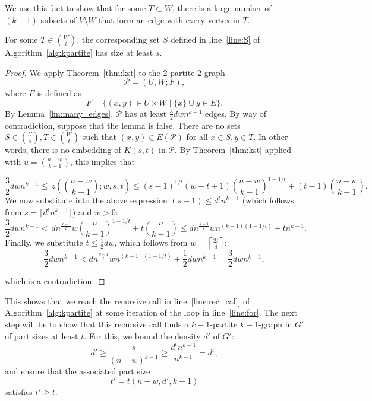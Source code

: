 We use this fact to show that for some $T \subset W$,
there is a large number of $(k-1)$-subsets of $V \setminus W$
that form an edge with every vertex in $T$.

\begin{lemma}\label{lm:return}
    For some $T \in \binom{W}{t}$, the corresponding set $S$ defined
    in line~\ref{line:S} of Algorithm~\ref{alg:kpartite} has size at least $s$.
    \begin{proof}
        We apply Theorem~\ref{thm:kst} to the $2$-partite $2$-graph
        \[
            \mathcal{P} = (U, W; F),
        \]
        where $F$ is defined as
        \[
            F = \{(x, y) \in U \times W \mid \{x\} \cup y \in E \}.
        \]
        By Lemma~\ref{lm:many_edges}, $\mathcal{P}$ has at least
        $\frac{3}{2}dwn^{k-1}$ edges.
        By way of contradiction, suppose that the lemma is false.
        There are no sets $S \in \binom{U}{s}, T \in \binom{W}{t}$
        such that $(x, y) \in E (\mathcal{P})$ for all $x \in S, y \in T $.
        In other words, there is no embedding of $K(s, t)$ in $\mathcal{P}$.
        By Theorem~\ref{thm:kst} applied with $u = \binom{n-w}{k-1}$,
        this implies that

        \[
            \frac{3}{2}dwn^{k-1} \leq
            \, z \left(\binom{n - w}{k-1}; w, s, t  \right) \leq
            (s-1)^{1/t}(w-t+1)\binom{n-w}{k-1}^{1-1/t} + (t-1)\binom{n-w}{k-1}.
        \]
        We now substitute into the above expression $(s-1) \leq d^t n^{k-1}$ (which
        follows from $s = \lceil d^t n^{k-1} \rceil$) and $w > 0$:
        \[
             \frac{3}{2}dwn^{k-1} <
             \, dn^{\frac{k-1}{t}} w \binom{n}{k-1}^{1-1/t} + t \binom{n}{k-1} \leq
             dn^{\frac{k-1}{t}} wn^{(k-1)(1-1/t)} + tn^{k-1}.
        \]
        Finally, we substitute $t \leq \frac{1}{2}dw$, which follows from
        $w = \left\lceil \frac{2t}{d} \right\rceil$:
        \[
            \frac{3}{2}dwn^{k-1} <
            dn^{\frac{k-1}{t}} wn^{(k-1)(1-1/t)} + \frac{1}{2} dwn^{k-1} =
            \frac{3}{2} dwn^{k-1},
        \]

        which is a contradiction.
    \end{proof}
\end{lemma}

This shows that we reach the recursive call in line~\ref{line:rec_call} of Algorithm~\ref{alg:kpartite}
at some iteration of the loop in line~\ref{line:for}.
The next step will be to show that this recursive call finds a $k-1$-partite $k-1$-graph in $G'$ of
part sizes at least $t$.
For this, we bound the density $d'$ of $G'$:
\[
    d' \geq \frac{s}{(n-w)^{k-1}} \geq \frac{d^t n^{k-1}}{n^{k-1}} = d^t,
\]
and ensure that the associated part size
\[
    t' = t(n - w, d', k - 1)
\]
satisfies $t' \geq t$.

